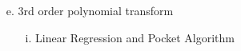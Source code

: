 \documentclass{homework}
\begin{document}
\begin{itemize}
    \item[e.] 3rd order polynomial transform
    \begin{itemize}
        \item[i.] Linear Regression and Pocket Algorithm
        \begin{figure}[H]
            \centering
            \qquad
        \end{figure}


\end{itemize}
\end{itemize}
\end{document}
